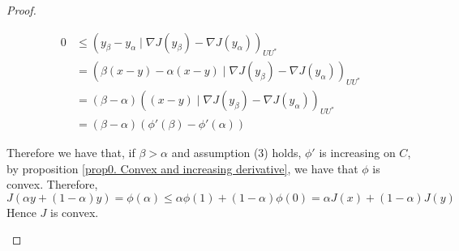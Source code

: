 \begin{proposition}
\begin{proof}
\begin{itemize}
		 \begin{align*}
		 0 &\leq (y_\beta - y_\alpha \mid \nabla J(y_\beta)-\nabla J(y_\alpha))_{UU^*}\\
		   &=(\beta (x-y) - \alpha(x-y) \mid \nabla J(y_\beta)-\nabla J(y_\alpha))_{UU^*} \\
	 	   &=(\beta-\alpha) ((x-y) \mid \nabla J(y_\beta)-\nabla J(y_\alpha))_{UU^*} \\
	 	   &= (\beta-\alpha) \left(\phi'(\beta)-\phi'(\alpha)\right)
		 \end{align*} 
		 
		 Therefore we have that, if $\beta > \alpha$ and assumption (3) holds, $\phi'$ is increasing on $C$, by proposition \eqref{prop0. Convex and increasing derivative}, we have that $\phi$ is convex. Therefore,
		 \[
		 J(\alpha y+(1-\alpha)y)=\phi(\alpha) \leq \alpha \phi(1)+(1-\alpha)\phi(0)=\alpha J(x) +(1-\alpha)J(y)
		 \]
		 Hence $J$ is convex.
		\end{itemize}
	 \end{proof}
\label{prop5. First derivative convex.}
\end{proposition}

